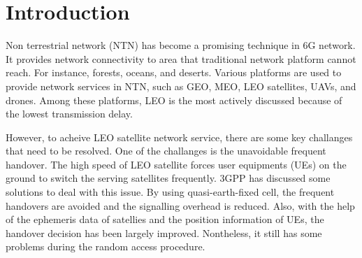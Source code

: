 \chapter{Introduction}
\label{chap:introduction}


Non terrestrial network (NTN) has become a promising technique in 6G network. It provides network connectivity to area that traditional network platform cannot reach. For instance, forests, oceans, and deserts. Various platforms are used to provide network services in NTN, such as GEO, MEO, LEO satellites, UAVs, and drones. Among these platforms, LEO is the most actively discussed because of the lowest transmission delay. 

However, to acheive LEO satellite network service, there are some key challanges that need to be resolved. One of the challanges is the unavoidable frequent handover. The high speed of LEO satellite forces user equipments (UEs) on the ground to switch the serving satellites frequently. 3GPP has discussed some solutions to deal with this issue. By using quasi-earth-fixed cell, the frequent handovers are avoided and the signalling overhead is reduced. Also, with the help of the ephemeris data of satellies and the position information of UEs, the handover decision has been largely improved. Nontheless, it still has some problems during the random access procedure. 